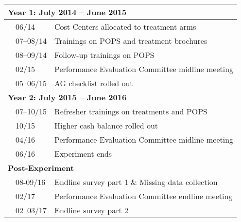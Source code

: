 \begin{tabular}{lll}
\toprule
\multicolumn{3}{l}{\textbf{Year 1: July 2014 -- June 2015}} \\
\midrule
& 06/14 & Cost Centers allocated to treatment arms \\
& 07--08/14 & Trainings on POPS and treatment brochures \\
& 08--09/14 & Follow-up trainings on POPS \\
& 02/15 & Performance Evaluation Committee midline meeting \\
& 05--06/15 & AG checklist rolled out \\
\midrule
\multicolumn{3}{l}{\textbf{Year 2: July 2015 -- June 2016}} \\
\midrule
& 07--10/15 & Refresher trainings on treatments and POPS \\
& 10/15 & Higher cash balance rolled out \\
& 04/16 & Performance Evaluation Committee midline meeting \\
& 06/16 & Experiment ends \\
\midrule
\multicolumn{3}{l}{\textbf{Post-Experiment}} \\
\midrule
& 08-09/16 & Endline survey part 1 \& Missing data collection \\
& 02/17 & Performance Evaluation Committee endline meeting \\
& 02--03/17 & Endline survey part 2 \\
\bottomrule
\end{tabular}
